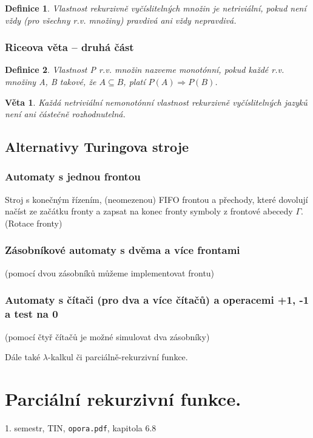 \documentclass[a4paper, 11pt]{report}
\newtheorem{mydef}{Definice}[chapter]
\newtheorem{veta}{Věta}[chapter]
\begin{document}
\begin{mydef}
Vlastnost rekurzivně vyčíslitelných množin je netriviální, pokud není vždy (pro všechny r.v. množiny) pravdivá ani vždy nepravdivá.
\end{mydef}

\subsection{Riceova věta -- druhá část}
\begin{mydef}
Vlastnost P r.v. množin nazveme monotónní, pokud každé r.v. množiny A, B takové, že $A \subseteq B$, platí $P(A) \Rightarrow P(B)$.
\end{mydef}

\begin{veta}
Každá netriviální nemonotónní vlastnost rekurzivně vyčíslitelných jazyků není ani částečně rozhodnutelná.
\end{veta}

\section{Alternativy Turingova stroje}
\subsection{Automaty s jednou frontou}
Stroj s konečným řízením, (neomezenou) FIFO frontou a přechody, které dovolují načíst ze začátku fronty a zapsat na konec fronty symboly z frontové abecedy $\Gamma$. (Rotace fronty)

\subsection{Zásobníkové automaty s dvěma a více frontami}
(pomocí dvou zásobníků můžeme implementovat frontu)

\subsection{Automaty s čítači (pro dva a více čítačů) a operacemi +1, -1 a test na 0}
(pomocí čtyř čítačů je možné simulovat dva zásobníky)

Dále také $\lambda$-kalkul či parciálně-rekurzivní funkce.




\chapter{Parciální rekurzivní funkce.} \label{cha:24}
1. semestr, TIN, \texttt{opora.pdf}, kapitola 6.8
\end{document}
